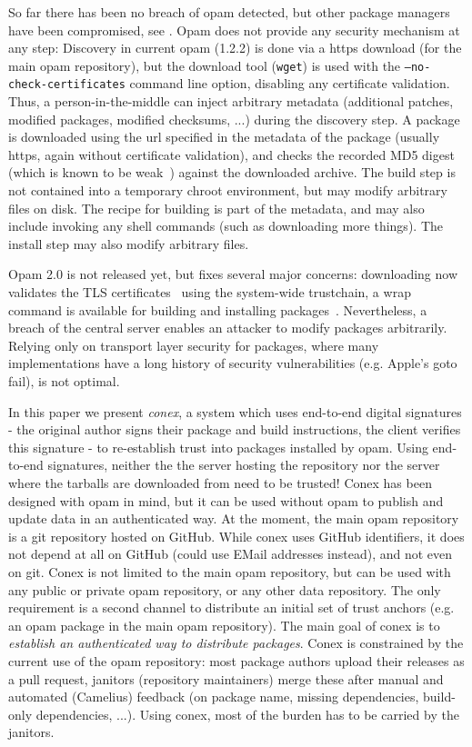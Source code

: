 \documentclass[nocopyrightspace]{sigplanconf}
\begin{document}
So far there has been no breach of opam detected, but other package managers have been compromised, see \cite{cabal,maven,npm,rubygems}.
Opam does not provide any security mechanism at any step:
Discovery in current opam (1.2.2) is done via a https download (for the main opam repository), but the download tool (\texttt{wget}) is used with the \texttt{--no-check-certificates} command line option, disabling any certificate validation.
Thus, a person-in-the-middle can inject arbitrary metadata (additional patches, modified packages, modified checksums, ...) during the discovery step.
A package is downloaded using the url specified in the metadata of the package (usually https, again without certificate validation), and checks the recorded MD5 digest (which is known to be weak~\cite{rfc6151}) against the downloaded archive.
The build step is not contained into a temporary chroot environment, but may modify arbitrary files on disk.
The recipe for building is part of the metadata, and may also include invoking any shell commands (such as downloading more things).
The install step may also modify arbitrary files.

Opam 2.0 is not released yet, but fixes several major concerns:
downloading now validates the TLS certificates~\cite{opampr} using the system-wide trustchain,
a wrap command is available for building and installing packages~\cite{wrappr}.
Nevertheless, a breach of the central server enables an attacker to modify packages arbitrarily.
Relying only on transport layer security for packages, where many implementations have a long history of security vulnerabilities (e.g. Apple's goto fail), is not optimal.

In this paper we present \emph{conex}, a system which uses end-to-end digital signatures - the original author signs their package and build instructions, the client verifies this signature - to re-establish trust into packages installed by opam.
Using end-to-end signatures, neither the the server hosting the repository nor the server where the tarballs are downloaded from need to be trusted!
Conex has been designed with opam in mind, but it can be used without opam to publish and update data in an authenticated way.
At the moment, the main opam repository is a git repository hosted on GitHub.
While conex uses GitHub identifiers, it does not depend at all on GitHub (could use EMail addresses instead), and not even on git.
Conex is not limited to the main opam repository, but can be used with any public or private opam repository, or any other data repository.
The only requirement is a second channel to distribute an initial set of trust anchors (e.g. an opam package in the main opam repository).
The main goal of conex is to \emph{establish an authenticated way to distribute packages}.
Conex is constrained by the current use of the opam repository:  most package authors upload their releases as a pull request, janitors (repository maintainers) merge these after manual and automated (Camelius) feedback (on package name, missing dependencies, build-only dependencies, ...).
Using conex, most of the burden has to be carried by the janitors.
\end{document}
